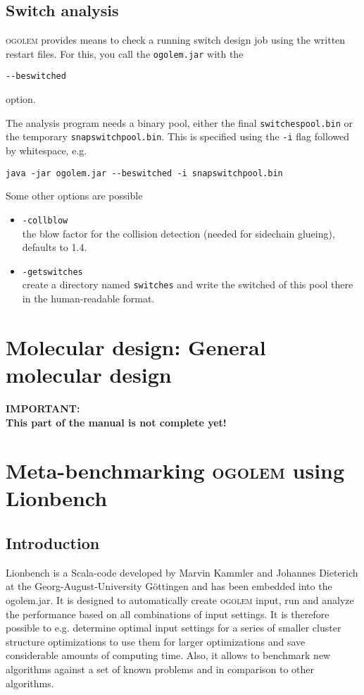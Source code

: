 \documentclass[a4paper,10pt]{scrbook}
\newcommand{\ogo}{\textsc{ogolem}}
\begin{document}
\section{Switch analysis}
\ogo{} provides means to check a running switch design job using the written
restart files. For this, you call the
\texttt{ogolem.jar} with the
\begin{verbatim}
--beswitched
\end{verbatim}
option.

The analysis program needs a binary pool, either the final
\texttt{switchespool.bin}
or the temporary \texttt{snapswitchpool.bin}. This is specified using the
\texttt{-i} flag followed by whitespace, e.g.
\begin{verbatim}
java -jar ogolem.jar --beswitched -i snapswitchpool.bin
\end{verbatim}

Some other options are possible
\begin{itemize}
  \item \texttt{-collblow}\\
	the blow factor for the collision detection (needed for sidechain
glueing), defaults to 1.4.
  \item \texttt{-getswitches}\\
	 create a directory named \texttt{switches} and write the switched of
this pool there in the human-readable format.
\end{itemize}


\chapter{Molecular design: General molecular design}
\textbf{IMPORTANT:\\
This part of the manual is not complete yet!}

\chapter{Meta-benchmarking \textsc{ogolem} using Lionbench}
\section{Introduction}
Lionbench is a Scala-code developed by Marvin Kammler and Johannes Dieterich at 
the Georg-August-University G\"ottingen and has been embedded into the 
ogolem.jar. It is designed to automatically create \textsc{ogolem} input, run 
and analyze the performance based on all combinations of input settings. It is 
therefore possible to e.g. determine optimal input settings for a series of 
smaller cluster structure optimizations to use them for larger optimizations 
and save considerable amounts of computing time. Also, it allows to benchmark 
new algorithms against a set of known problems and in comparison to other 
algorithms.
\end{document}
